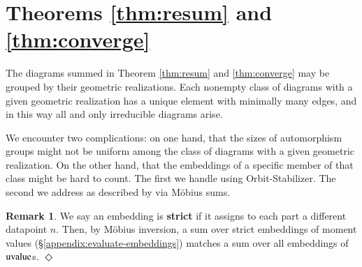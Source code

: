 \documentclass[openany, notitlepage, justified]{tufte-book}
\theoremstyle{plain}
\theoremstyle{definition}
\newtheorem{rmk}{Remark}
\newcommand{\uvalue}{\text{\textnormal{uvalue}}}
\newcommand{\mend}{\hfill $\Diamond$}
\begin{document}
    \section{Theorems \ref{thm:resum} and \ref{thm:converge}}    \label{appendix:resum}

        The diagrams summed in Theorem \ref{thm:resum} and \ref{thm:converge}
        may be grouped by their geometric realizations.  Each nonempty class of
        diagrams with a given geometric realization has a unique element with
        minimally many edges, and in this way all and only irreducible diagrams
        arise. 

        We encounter two complications: on one hand, that the sizes of
        automorphism groups might not be uniform among the class of diagrams
        with a given geometric realization.  On the other hand, that the
        embeddings of a specific member of that class might be hard to count.
        The first we handle using Orbit-Stabilizer.  The second we address as
        described by \label{subsubsect:resum} via M\"obius sums.

        \begin{rmk}
            We say an embedding is \textbf{strict} if it assigns to each part a
            different datapoint $n$.  Then, by M\"obius inversion,\cite{ro64} a
            sum over strict embeddings of moment values
            (\S\ref{appendix:evaluate-embeddings}) matches a sum over all
            embeddings of $\uvalue$s.
            \mend
        \end{rmk}
           
\end{document}
